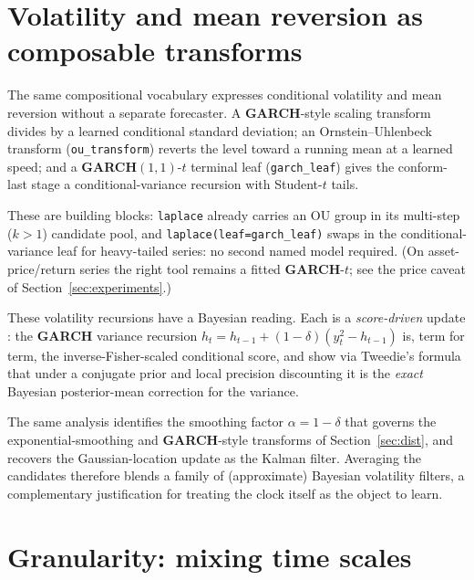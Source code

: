 \documentclass[article]{jss}
\providecommand{\pkg}[1]{\textbf{#1}}
\providecommand{\code}[1]{\texttt{#1}}
\begin{document}
\section{Volatility and mean reversion as composable transforms} \label{sec:doob}

The same compositional vocabulary expresses conditional volatility and mean
reversion without a separate forecaster. A \pkg{GARCH}-style scaling transform
divides by a learned conditional standard deviation; an Ornstein--Uhlenbeck
transform (\code{ou\_transform}) reverts the level toward a running mean at a
learned speed; and a \pkg{GARCH}$(1,1)$-$t$ terminal leaf (\code{garch\_leaf})
gives the conform-last stage a conditional-variance recursion with Student-$t$
tails.

These are building blocks: \code{laplace} already carries an OU group in
its multi-step ($k>1$) candidate pool, and \code{laplace(leaf=garch\_leaf)} swaps
in the conditional-variance leaf for heavy-tailed series: no second named model
required. (On asset-price/return series the right tool remains a fitted
\pkg{GARCH}-$t$; see the price caveat of Section~\ref{sec:experiments}.)

These volatility recursions have a Bayesian reading. Each is a \emph{score-driven}
update \citep{creal2013generalized,harvey2013dynamic}: the \pkg{GARCH} variance
recursion $h_t = h_{t-1} + (1-\delta)(y_t^2 - h_{t-1})$ is, term for term, the
inverse-Fisher-scaled conditional score, and \citet{hansen2026tweedie} show via
Tweedie's formula that under a conjugate prior and local precision discounting it
is the \emph{exact} Bayesian posterior-mean correction for the variance.

The same
analysis identifies the smoothing factor $\alpha = 1-\delta$ that governs the
exponential-smoothing and \pkg{GARCH}-style transforms of
Section~\ref{sec:dist}, and recovers the Gaussian-location update as the Kalman
filter. Averaging the candidates therefore blends a family of (approximate)
Bayesian volatility filters, a complementary justification for treating the clock
itself as the object to learn.

\section{Granularity: mixing time scales} \label{sec:granularity}
\end{document}
